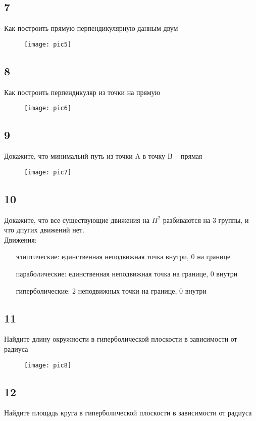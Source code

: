 	\subsection*{7}
	Как построить прямую перпендикулярную данным двум
	\begin{figure}[h]
		\texttt{[image: pic5]}
	\end{figure}
	
	\subsection*{8}
	Как построить перпендикуляр из точки на прямую
	\begin{figure}[h]
		\texttt{[image: pic6]}
	\end{figure}

	\subsection*{9}
	Докажите, что минимальнй путь из точки A в точку B -- прямая
	\begin{figure}[h]
		\texttt{[image: pic7]}
	\end{figure}
\newpage
	\subsection*{10}
	Докажите, что все существующие движения на $H^{2}$ разбиваются на 3 группы, и что дпугих движений нет.\\
	Движения:
	\begin{enumerate}
		\item[элиптические:] единственная неподвижная точка внутри, 0 на границе 
		\item[параболические:] единственная неподвижная точка на границе, 0 внутри
		\item[гиперболические:] 2 неподвижных точки на границе, 0 внутри
	\end{enumerate}
	\subsection*{11}
	Найдите длину окружности в гиперболической плоскости в зависимости от радиуса
	\begin{figure}[h]
		\texttt{[image: pic8]}
	\end{figure}
	\subsection*{12}
	Найдите площадь круга в гиперболической плоскости в зависимости от радиуса
	
